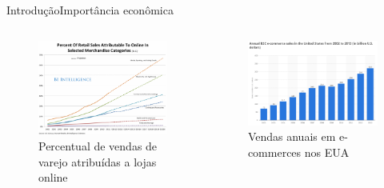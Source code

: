 \begin{frame}{Introdução}{Importância econômica}
\begin{columns}[c] %


\begin{figure}[ht]
    \begin{center}
    \includegraphics[width=1\textwidth]{img/crescimento-ecommerce}\caption{Percentual de vendas de varejo atribuídas a lojas online \cite{crescimento-ecommerce}}
    \end{center}
\end{figure}

\begin{figure}[ht]
    \begin{center}
    \includegraphics[width=1\textwidth]{img/sales-ecommerce}\caption{Vendas anuais em e-commerces nos EUA \cite{sales-ecommerce}}
    \end{center}
\end{figure}

\end{columns}

\end{frame}
